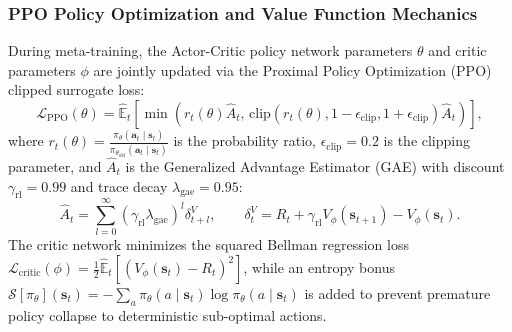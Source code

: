 \subsubsection{PPO Policy Optimization and Value Function Mechanics}
During meta-training, the Actor-Critic policy network parameters $\theta$ and critic parameters $\phi$ are jointly updated via the Proximal Policy Optimization (PPO) clipped surrogate loss:
\begin{equation}
    \mathcal{L}_{\text{PPO}}(\theta) = \hat{\mathbb{E}}_t \left[ \min\left( r_t(\theta)\hat{A}_t, \, \text{clip}(r_t(\theta), 1-\epsilon_{\text{clip}}, 1+\epsilon_{\text{clip}})\hat{A}_t \right) \right],
\end{equation}
where $r_t(\theta) = \frac{\pi_\theta(\mathbf{a}_t \mid \mathbf{s}_t)}{\pi_{\theta_{\text{old}}}(\mathbf{a}_t \mid \mathbf{s}_t)}$ is the probability ratio, $\epsilon_{\text{clip}} = 0.2$ is the clipping parameter, and $\hat{A}_t$ is the Generalized Advantage Estimator (GAE) with discount $\gamma_{\text{rl}} = 0.99$ and trace decay $\lambda_{\text{gae}} = 0.95$:
\begin{equation}
    \hat{A}_t = \sum_{l=0}^{\infty} (\gamma_{\text{rl}} \lambda_{\text{gae}})^l \delta_{t+l}^V, \qquad \delta_t^V = R_t + \gamma_{\text{rl}} V_\phi(\mathbf{s}_{t+1}) - V_\phi(\mathbf{s}_t).
\end{equation}
The critic network minimizes the squared Bellman regression loss $\mathcal{L}_{\text{critic}}(\phi) = \frac{1}{2}\hat{\mathbb{E}}_t \left[ (V_\phi(\mathbf{s}_t) - R_t)^2 \right]$, while an entropy bonus $\mathcal{S}[\pi_\theta](\mathbf{s}_t) = -\sum_a \pi_\theta(a \mid \mathbf{s}_t) \log \pi_\theta(a \mid \mathbf{s}_t)$ is added to prevent premature policy collapse to deterministic sub-optimal actions.
